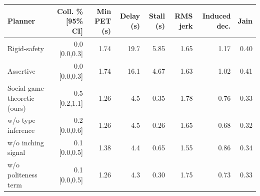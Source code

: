 \begin{tabular}{lrrrrrrr}
\toprule
Planner & Coll. \% [95\% CI] & Min PET (s) & Delay (s) & Stall (s) & RMS jerk & Induced dec. & Jain \\
\midrule
Rigid-safety & 0.0 [0.0,0.3] & 1.74 & 19.7 & 5.85 & 1.65 & 1.17 & 0.40 \\
Assertive & 0.0 [0.0,0.3] & 1.74 & 16.1 & 4.67 & 1.63 & 1.02 & 0.41 \\
Social game-theoretic (ours) & 0.5 [0.2,1.1] & 1.26 & 4.5 & 0.35 & 1.78 & 0.76 & 0.33 \\
\quad w/o type inference & 0.2 [0.0,0.6] & 1.26 & 4.5 & 0.26 & 1.65 & 0.68 & 0.32 \\
\quad w/o inching signal & 0.1 [0.0,0.5] & 1.38 & 4.4 & 0.65 & 1.55 & 0.86 & 0.34 \\
\quad w/o politeness term & 0.1 [0.0,0.5] & 1.26 & 4.3 & 0.30 & 1.75 & 0.73 & 0.33 \\
\bottomrule
\end{tabular}
